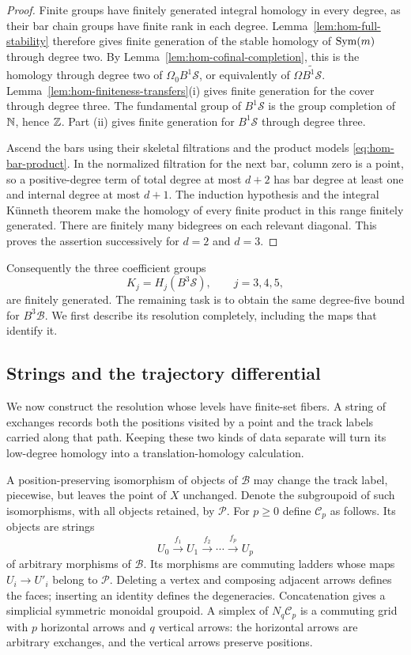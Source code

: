 \begin{proof}
Finite groups have finitely generated integral homology in every
degree, as their bar chain groups have finite rank in each degree.
Lemma~\ref{lem:hom-full-stability} therefore gives finite
generation of the stable homology of $\operatorname{Sym}(m)$ through degree two.
By Lemma~\ref{lem:hom-cofinal-completion}, this is the homology
through degree two of $\Omega_0 B^1\mathcal S$, or equivalently
of $\Omega\widetilde{B^1\mathcal S}$.
Lemma~\ref{lem:hom-finiteness-transfers}(i) gives finite
generation for the cover through degree three.  The fundamental
group of $B^1\mathcal S$ is the group completion of $\mathbb N$, hence
$\mathbb Z$.  Part (ii) gives finite generation for $B^1\mathcal S$
through degree three.

Ascend the bars using their skeletal filtrations and the product
models \eqref{eq:hom-bar-product}.  In the normalized filtration
for the next bar, column zero is a point, so a positive-degree
term of total degree at most $d+2$ has bar degree at least one
and internal degree at most $d+1$.  The induction hypothesis and
the integral K\"unneth theorem make the homology of every finite
product in this range finitely generated.  There are finitely
many bidegrees on each relevant diagonal.  This proves the
assertion successively for $d=2$ and $d=3$.
\end{proof}

Consequently the three coefficient groups
\begin{equation}\label{eq:hom-Kj}
 K_j=H_j(B^3\mathcal S),\qquad j=3,4,5,
\end{equation}
are finitely generated.  The remaining task is to obtain the same
degree-five bound for $B^3\mathcal B$.  We first describe its
resolution completely, including the maps that identify it.

\subsection{Strings and the trajectory differential}

We now construct the resolution whose levels have finite-set fibers.
A string of exchanges records both the positions visited by a point
and the track labels carried along that path.  Keeping these two
kinds of data separate will turn its low-degree homology into a
translation-homology calculation.

A position-preserving isomorphism of objects of $\mathcal B$ may
change the track label, piecewise, but leaves the point of $X$
unchanged.  Denote the subgroupoid of such isomorphisms, with all
objects retained, by $\mathcal P$.  For $p\geq0$ define
$\mathcal C_p$ as follows.  Its objects are strings
\[
 U_0\xrightarrow{f_1}U_1\xrightarrow{f_2}\cdots
       \xrightarrow{f_p}U_p
\]
of arbitrary morphisms of $\mathcal B$.  Its morphisms are
commuting ladders whose maps $U_i\to U'_i$ belong to
$\mathcal P$.  Deleting a vertex and composing adjacent arrows
defines the faces; inserting an identity defines the degeneracies.
Concatenation gives a simplicial symmetric monoidal groupoid.
A simplex of $N_q\mathcal C_p$ is a commuting grid with $p$
horizontal arrows and $q$ vertical arrows: the horizontal arrows
are arbitrary exchanges, and the vertical arrows preserve positions.

